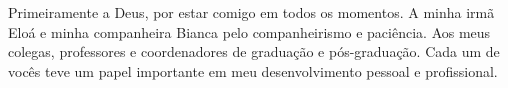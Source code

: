 \begin{agradecimentos}
	Primeiramente a Deus, por estar comigo em todos os momentos.
	A minha irmã Eloá e minha companheira Bianca pelo companheirismo e paciência.
	Aos meus colegas, professores e coordenadores de graduação e pós-graduação.
	Cada um de vocês teve um papel importante em meu desenvolvimento pessoal e profissional.	
\end{agradecimentos}